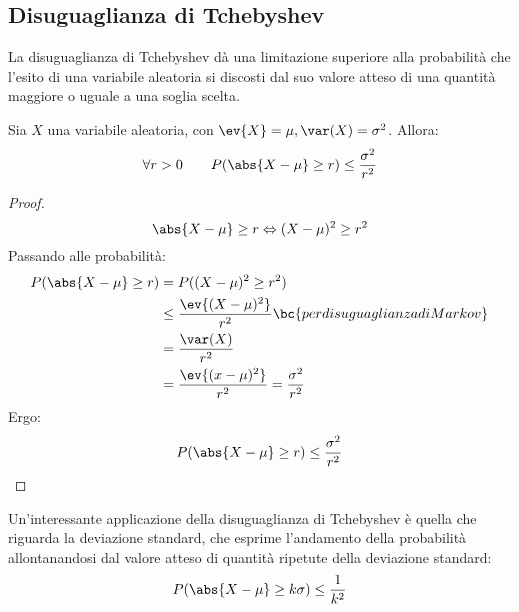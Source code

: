 \subsection{Disuguaglianza di Tchebyshev}
La disuguaglianza di Tchebyshev dà una limitazione superiore alla probabilità che l'esito di una variabile aleatoria si discosti dal suo valore atteso di una quantità maggiore o uguale a una soglia scelta.
\begin{teor}
	Sia $X$ una variabile aleatoria, con $\ev{X}=\mu, \var(X)=\sigma^2$. Allora:
	\begin{equation*}
		\forall r>0\qquad P(\abs{X-\mu}\geq r)\leq \frac{\sigma^2}{r^2}
	\end{equation*}
\end{teor}
\begin{proof}
	\begin{equation*}
		\abs{X-\mu}\geq r \Leftrightarrow (X-\mu)^2 \geq r^2
	\end{equation*}
	Passando alle probabilità:
	\begin{align*}
		P(\abs{X-\mu}\geq r) & = P((X-\mu)^2 \geq r^2)                                       \\
		                     & \leq \frac{\ev{(X-\mu)^2}}{r^2} \bc{per disuguaglianza di Markov} \\
		                     & =\frac{\var(X)}{r^2} 					\\
		                     & = \frac{\ev{(x-\mu)^2}}{r^2} = \frac{\sigma^2}{r^2}
	\end{align*}
	Ergo:
	\begin{equation*}
		P(\abs{X-\mu}\geq r)\leq \frac{\sigma^2}{r^2}
	\end{equation*}
\end{proof}

Un'interessante applicazione della disuguaglianza di Tchebyshev è quella che riguarda la deviazione standard, che esprime l'andamento della probabilità allontanandosi dal valore atteso di quantità ripetute della deviazione standard:
\begin{equation*}
	P(\abs{X-\mu}\geq k\sigma)\leq\frac{1}{k^2}
\end{equation*}
